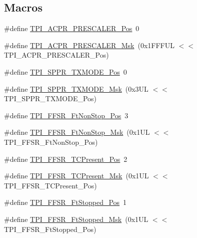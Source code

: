 \subsection*{Macros}
\begin{DoxyCompactItemize}
\item 
\#define \hyperlink{group___c_m_s_i_s___t_p_i_ga5a82d274eb2df8b0c92dd4ed63535928}{T\+P\+I\+\_\+\+A\+C\+P\+R\+\_\+\+P\+R\+E\+S\+C\+A\+L\+E\+R\+\_\+\+Pos}~0
\item 
\#define \hyperlink{group___c_m_s_i_s___t_p_i_ga4fcacd27208419929921aec8457a8c13}{T\+P\+I\+\_\+\+A\+C\+P\+R\+\_\+\+P\+R\+E\+S\+C\+A\+L\+E\+R\+\_\+\+Msk}~(0x1\+F\+F\+F\+U\+L $<$$<$ T\+P\+I\+\_\+\+A\+C\+P\+R\+\_\+\+P\+R\+E\+S\+C\+A\+L\+E\+R\+\_\+\+Pos)
\item 
\#define \hyperlink{group___c_m_s_i_s___t_p_i_ga0f302797b94bb2da24052082ab630858}{T\+P\+I\+\_\+\+S\+P\+P\+R\+\_\+\+T\+X\+M\+O\+D\+E\+\_\+\+Pos}~0
\item 
\#define \hyperlink{group___c_m_s_i_s___t_p_i_gaca085c8a954393d70dbd7240bb02cc1f}{T\+P\+I\+\_\+\+S\+P\+P\+R\+\_\+\+T\+X\+M\+O\+D\+E\+\_\+\+Msk}~(0x3\+U\+L $<$$<$ T\+P\+I\+\_\+\+S\+P\+P\+R\+\_\+\+T\+X\+M\+O\+D\+E\+\_\+\+Pos)
\item 
\#define \hyperlink{group___c_m_s_i_s___t_p_i_ga9537b8a660cc8803f57cbbee320b2fc8}{T\+P\+I\+\_\+\+F\+F\+S\+R\+\_\+\+Ft\+Non\+Stop\+\_\+\+Pos}~3
\item 
\#define \hyperlink{group___c_m_s_i_s___t_p_i_gaaa313f980974a8cfc7dac68c4d805ab1}{T\+P\+I\+\_\+\+F\+F\+S\+R\+\_\+\+Ft\+Non\+Stop\+\_\+\+Msk}~(0x1\+U\+L $<$$<$ T\+P\+I\+\_\+\+F\+F\+S\+R\+\_\+\+Ft\+Non\+Stop\+\_\+\+Pos)
\item 
\#define \hyperlink{group___c_m_s_i_s___t_p_i_gad30fde0c058da2ffb2b0a213be7a1b5c}{T\+P\+I\+\_\+\+F\+F\+S\+R\+\_\+\+T\+C\+Present\+\_\+\+Pos}~2
\item 
\#define \hyperlink{group___c_m_s_i_s___t_p_i_ga0d6bfd263ff2fdec72d6ec9415fb1135}{T\+P\+I\+\_\+\+F\+F\+S\+R\+\_\+\+T\+C\+Present\+\_\+\+Msk}~(0x1\+U\+L $<$$<$ T\+P\+I\+\_\+\+F\+F\+S\+R\+\_\+\+T\+C\+Present\+\_\+\+Pos)
\item 
\#define \hyperlink{group___c_m_s_i_s___t_p_i_gaedf31fd453a878021b542b644e2869d2}{T\+P\+I\+\_\+\+F\+F\+S\+R\+\_\+\+Ft\+Stopped\+\_\+\+Pos}~1
\item 
\#define \hyperlink{group___c_m_s_i_s___t_p_i_ga1ab6c3abe1cf6311ee07e7c479ce5f78}{T\+P\+I\+\_\+\+F\+F\+S\+R\+\_\+\+Ft\+Stopped\+\_\+\+Msk}~(0x1\+U\+L $<$$<$ T\+P\+I\+\_\+\+F\+F\+S\+R\+\_\+\+Ft\+Stopped\+\_\+\+Pos)
\item 
$$
\end{DoxyCompactItemize}
